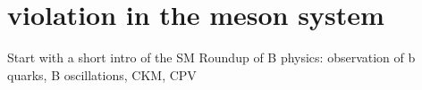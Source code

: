 
\chapter[
  head={\CP violation in the \Bd meson system},
  tocentry={\CPbfsf violation in the \Bdbfsf meson system}]
{\CPbfsf violation in the \Bdbfsf meson system}
\label{ch:cpv_theory}

Start with a short intro of the SM
Roundup of B physics: observation of b quarks, B oscillations, CKM, CPV







